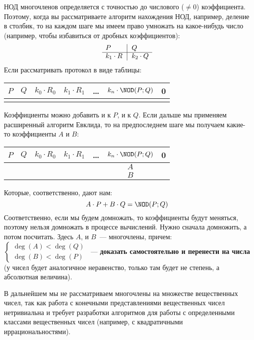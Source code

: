 \documentclass[russian]{lecture-notes}
\theoremstyle{definition}
\DeclareMathOperator{\Deg}{deg}
\newcommand{\D}[1]{\Deg(#1)}
\newcommand{\N}[2]{\NOD(#1;#2)}
\begin{document}
	\begin{remark}
		НОД многочленов определяется с точностью до числового ($\ne 0$) коэффициента. Поэтому, когда вы рассматриваете алгоритм нахождения НОД, например, деление в столбик, то на каждом шаге мы имеем право умножать на какое-нибудь число (например, чтобы избавиться от дробных коэффициентов):
		\[
			\begin{array}{l@{\,}r|l}
			P & & \, Q \\
			\cline{1-3}
			k_1 \cdot R & & \, k_2 \cdot Q
			\end{array}
		\]
		Если рассматривать протокол в виде таблицы:
		\begin{table}[H]
			\centering
			\begin{tabular}{c|c|c|c|c|c|c}
				$P$ & $Q$ & $k_0 \cdot R_0$ & $k_1 \cdot R_1$ & \ldots & $k_n \cdot \N{P}{Q}$ & 0 \\
				\hline
				& & & & & &
			\end{tabular}
		\end{table}
		\noindent Коэффициенты можно добавить и к $P$, и к $Q$. Если дальше мы применяем расширенный алгоритм Евклида, то на предпоследнем шаге мы получаем какие-то коэффициенты $A$ и $B$:
		\begin{table}[H]
			\centering
			\begin{tabular}{c|c|c|c|c|c|c}
				$P$ & $Q$ & $k_0 \cdot R_0$ & $k_1 \cdot R_1$ & \ldots & $k_n \cdot \N{P}{Q}$ & 0 \\ \hline
				& & & & & $A$ & \\ \hline
				& & & & & $B$ &
			\end{tabular}
		\end{table}
		\noindent Которые, соответственно, дают нам:
		\[
			A \cdot P + B \cdot Q = \N{P}{Q}
		\]
		Соответственно, если мы будем домножать, то коэффициенты будут меняться, поэтому нельзя домножать в процессе вычислений. Нужно сначала домножить, а потом посчитать. Здесь $A$, и $B$~--- многочлены, причем: \\ 
		$\begin{cases}
			\D{A} < \D{Q} \\
			\D{B} < \D{P}
		\end{cases}$~--- \textbf{доказать самостоятельно и перенести на числа} (у чисел будет аналогичное неравенство, только там будет не степень, а абсолютная величина).
	\end{remark}

	\begin{note}
		 В дальнейшем мы не рассматриваем многочлены на множестве вещественных чисел, так как работа с конечными представлениями вещественных чисел нетривиальна и требует разработки алгоритмов для работы с определенными классами вещественных чисел (например, с квадратичными иррациональностями).
	\end{note}
\end{document}
